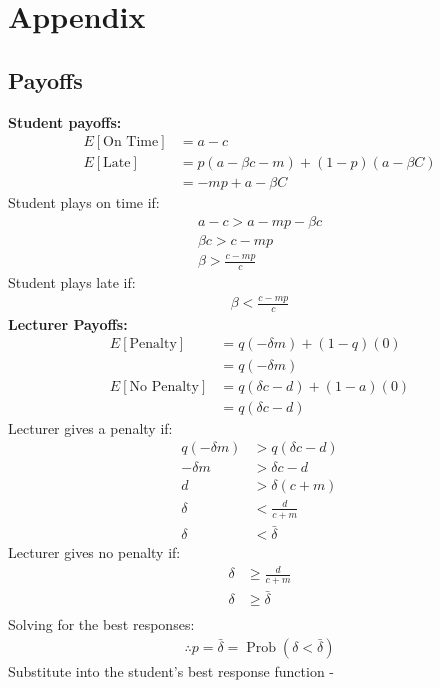 \documentclass[11pt,preprint, authoryear]{elsarticle}
\numberwithin{equation}{section}
\numberwithin{figure}{section}
\numberwithin{table}{section}
\begin{document}
\newpage

\hypertarget{appendix}{%
\section*{\texorpdfstring{Appendix
\label{app1}}{Appendix }}\label{appendix}}

\hypertarget{payoffs}{%
\subsection{Payoffs}\label{payoffs}}

\textbf{Student payoffs:} \begin{align*}
E[\text{On Time}]&= a- c \\
E[\text{Late}]&=  p(a-\beta c-m) +(1-p)(a-\beta C) \\
&=-m p+a-\beta C
\end{align*} Student plays on time if: \begin{align*}
a-c>a-m p-\beta c \\
\beta c>c-m p \\
\beta>\frac{c-m p}{c}
\end{align*} Student plays late if: \begin{align*}
\beta<\frac{c-m p}{c}
\end{align*} \textbf{Lecturer Payoffs:} \begin{align*}
E[\text{Penalty}]&=q(-\delta m)+(1-q)(0) \\
&=q(-\delta m) \\
E[\text{No Penalty}] &=q(\delta c-d)+(1-a)(0) \\
&=q(\delta c-d)
\end{align*} Lecturer gives a penalty if: \begin{align*}
q(-\delta m)&>q(\delta c-d) \\
-\delta m&>\delta c-d \\
d&>\delta(c+m) \\
\delta&<\frac{d}{c+m} \\
\delta &<\bar{\delta}
\end{align*} Lecturer gives no penalty if: \begin{align*}
\delta &\geq \frac{d}{c+m} \\
\delta &\geq \bar{\delta} \\
\end{align*} Solving for the best responses: \begin{align*}
\therefore p=\bar{\delta}=\operatorname{Prob}(\delta<\bar{\delta})
\end{align*} Substitute into the student's best response function -
\end{document}
